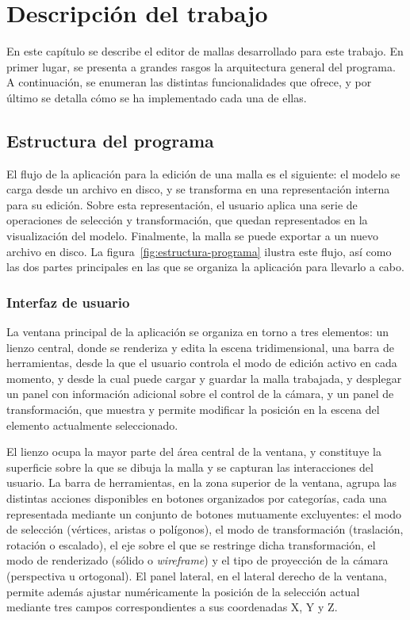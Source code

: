 \chapter{Descripción del trabajo} \label{cap:descripcionTrabajo}

En este capítulo se describe el editor de mallas desarrollado para este trabajo. En primer lugar, se presenta a grandes rasgos la arquitectura general del programa. A continuación, se enumeran las distintas funcionalidades que ofrece, y por último se detalla cómo se ha implementado cada una de ellas.

\section{Estructura del programa}

El flujo de la aplicación para la edición de una malla es el siguiente: el modelo se carga desde un archivo en disco, y se transforma en una representación interna para su edición. Sobre esta representación, el usuario aplica una serie de operaciones de selección y transformación, que quedan representados en la visualización del modelo. Finalmente, la malla se puede exportar a un nuevo archivo en disco. La figura~\ref{fig:estructura-programa} ilustra este flujo, así como las dos partes principales en las que se organiza la aplicación para llevarlo a cabo.

\subsection{Interfaz de usuario} \label{sec:UI}

La ventana principal de la aplicación se organiza en torno a tres elementos: un lienzo central, donde se renderiza y edita la escena tridimensional, una barra de herramientas, desde la que el usuario controla el modo de edición activo en cada momento, y desde la cual puede cargar y guardar la malla trabajada, y desplegar un panel con información adicional sobre el control de la cámara, y un panel de transformación, que muestra y permite modificar la posición en la escena del elemento actualmente seleccionado.

El lienzo ocupa la mayor parte del área central de la ventana, y constituye la superficie sobre la que se dibuja la malla y se capturan las interacciones del usuario. La barra de herramientas, en la zona superior de la ventana, agrupa las distintas acciones disponibles en botones organizados por categorías, cada una representada mediante un conjunto de botones mutuamente excluyentes: el modo de selección (vértices, aristas o polígonos), el modo de transformación (traslación, rotación o escalado), el eje sobre el que se restringe dicha transformación, el modo de renderizado (sólido o \textit{wireframe}) y el tipo de proyección de la cámara (perspectiva u ortogonal). El panel lateral, en el lateral derecho de la ventana, permite además ajustar numéricamente la posición de la selección actual mediante tres campos correspondientes a sus coordenadas X, Y y Z.

